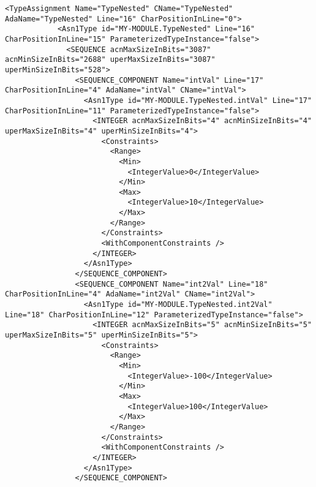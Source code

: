 
\begin{minipage}{15cm}
\begin{lstlisting}[style=CStyle, caption=Portion of an XML ASN1 grammar., label=asnXML, mathescape=true]
<TypeAssignment Name="TypeNested" CName="TypeNested" AdaName="TypeNested" Line="16" CharPositionInLine="0">
            <Asn1Type id="MY-MODULE.TypeNested" Line="16" CharPositionInLine="15" ParameterizedTypeInstance="false">
              <SEQUENCE acnMaxSizeInBits="3087" acnMinSizeInBits="2688" uperMaxSizeInBits="3087" uperMinSizeInBits="528">
                <SEQUENCE_COMPONENT Name="intVal" Line="17" CharPositionInLine="4" AdaName="intVal" CName="intVal">
                  <Asn1Type id="MY-MODULE.TypeNested.intVal" Line="17" CharPositionInLine="11" ParameterizedTypeInstance="false">
                    <INTEGER acnMaxSizeInBits="4" acnMinSizeInBits="4" uperMaxSizeInBits="4" uperMinSizeInBits="4">
                      <Constraints>
                        <Range>
                          <Min>
                            <IntegerValue>0</IntegerValue>
                          </Min>
                          <Max>
                            <IntegerValue>10</IntegerValue>
                          </Max>
                        </Range>
                      </Constraints>
                      <WithComponentConstraints />
                    </INTEGER>
                  </Asn1Type>
                </SEQUENCE_COMPONENT>
                <SEQUENCE_COMPONENT Name="int2Val" Line="18" CharPositionInLine="4" AdaName="int2Val" CName="int2Val">
                  <Asn1Type id="MY-MODULE.TypeNested.int2Val" Line="18" CharPositionInLine="12" ParameterizedTypeInstance="false">
                    <INTEGER acnMaxSizeInBits="5" acnMinSizeInBits="5" uperMaxSizeInBits="5" uperMinSizeInBits="5">
                      <Constraints>
                        <Range>
                          <Min>
                            <IntegerValue>-100</IntegerValue>
                          </Min>
                          <Max>
                            <IntegerValue>100</IntegerValue>
                          </Max>
                        </Range>
                      </Constraints>
                      <WithComponentConstraints />
                    </INTEGER>
                  </Asn1Type>
                </SEQUENCE_COMPONENT>
\end{lstlisting}
\end{minipage}


